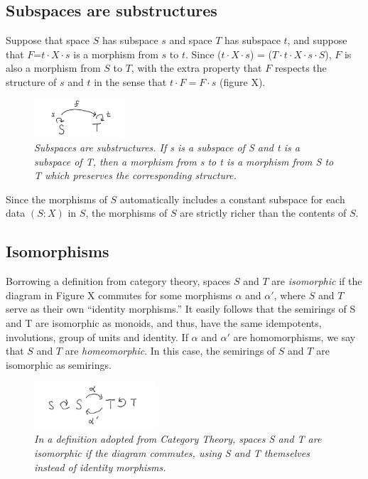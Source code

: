 \documentclass[11pt]{article}
\begin{document}
\subsection{Subspaces are substructures} 

Suppose that space $S$ has subspace $s$ and space $T$ has subspace $t$, and suppose that $F$=$t\cdot X\cdot s$ is a morphism from $s$ to $t$.   
Since ($t\cdot X\cdot s$) = ($T\cdot t \cdot X\cdot s\cdot S$), 
$F$ is also a morphism from $S$ to $T$, with the extra property that $F$ respects the structure of $s$ and $t$ in the sense that $t\cdot F=F\cdot s$ (figure X).
\begin{figure}[h]
\centering
\includegraphics[width=0.3\textwidth]{subspace.png}
\caption{{\it Subspaces are substructures.  If s is a subspace of S and t is a subspace of T, then a morphism from s to t is
a morphism from S to T which preserves the corresponding structure.}}
\end{figure}
Since the morphisms of $S$ automatically includes a constant subspace for each data $(S:X)$ in $S$, the morphisms of $S$ are strictly richer than the contents of $S$.  

\subsection{Isomorphisms} 

Borrowing a definition from category theory, spaces $S$ and $T$ are {\it isomorphic} if the diagram in Figure X commutes for 
some morphisms $\alpha$ and $\alpha'$, where $S$ and $T$ serve as their own ``identity morphisms.''  It easily follows that 
the semirings of S and T are isomorphic as monoids, and thus, have the same idempotents, involutions, group of units and identity.  
If $\alpha$ and $\alpha'$ are homomorphisms, we say that $S$ and $T$ are {\it homeomorphic}.  In this case, 
the semirings of $S$ and $T$ are isomorphic as semirings. 
\begin{figure}[h]
\centering
\includegraphics[width=0.4\textwidth]{isomorphism.png}
\caption{{\it In a definition adopted from Category Theory, spaces S and T are isomorphic if the diagram commutes, using S and T themselves instead of identity morphisms.}}
\end{figure}
\end{document}
